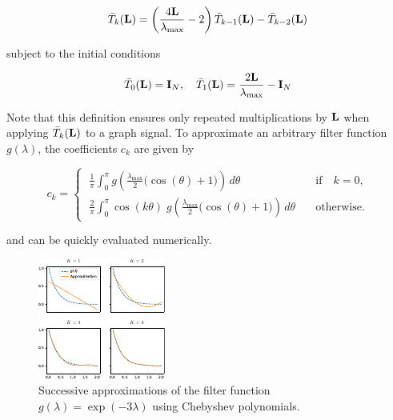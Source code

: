 \begin{equation}
    \bar{T}_k(\mathbf{L}) = \left(\frac{4 \mathbf{L} }{\lambda_{\text{max}}}  - 2\right) \bar{T}_{k-1}(\mathbf{L}) - \bar{T}_{k-2}(\mathbf{L})
\end{equation}

subject to the initial conditions

\begin{equation}
    \bar{T}_0(\mathbf{L}) = \mathbf{I}_N, \quad \bar{T}_1(\mathbf{L}) = \frac{2 \mathbf{L} }{\lambda_{\text{max}}} - \mathbf{I}_N
\end{equation}

Note that this definition ensures only repeated multiplications by $\mathbf{L}$ when applying $\bar{T}_k(\mathbf{L})$ to a graph signal. To approximate an arbitrary filter function $g(\lambda)$, the coefficients $c_k$ are given by 

\begin{equation}
    \label{eq:Cheb_int}
    c_k = \begin{cases}
        \displaystyle   
        \; \frac{1}{\pi} \int_{0}^{\pi} g\left(\frac{\lambda_{\text{max}}}{2} \big(\cos(\theta) + 1\big)\right) \, d\theta  & \quad \text{if} \quad k = 0, \\[0.8cm]
        \displaystyle   
        \; \frac{2}{\pi} \int_{0}^{\pi} \cos(k \theta) \; g\left(\frac{\lambda_{\text{max}}}{2} \big(\cos(\theta) + 1\big)\right) \, d\theta  & \quad \text{otherwise.}
    \end{cases}
\end{equation}

and can be quickly evaluated numerically. 

\begin{figure}[t]
	\centering
		\includegraphics[width=0.55\linewidth]{Figures/cheb.pdf}
	\caption[Successive approximations of a filter function using Chebyshev polynomials.]{Successive approximations of the filter function $g(\lambda) = \exp(-3\lambda)$ using Chebyshev polynomials. }
	\label{fig:Chebyshev}
\end{figure}


